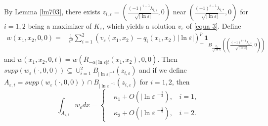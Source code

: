 \documentclass[12pt,reqno]{amsart}
\numberwithin{equation}{section}
\theoremstyle{definition}
\theoremstyle{remark}
\begin{document}
By Lemma \ref{lm703}, there exists $ z_{i,\varepsilon}=\left( \frac{(-1)^{i-1}\lambda_{i,\varepsilon}}{\sqrt{|\ln\varepsilon|}},0\right)  $ near $ \left( \frac{(-1)^{i-1}\lambda_{i,*}}{\sqrt{|\ln\varepsilon|}},0\right) $  for $ i=1,2 $ being a maximizer of $ K_\varepsilon  $, which yields a solution $ v_\varepsilon $ of \eqref{equa 3}.  Define 
\begin{equation*} 
\begin{split}
w(x_1,x_2,0,0)=&\frac{1}{\varepsilon^2}\sum_{i=1}^2\left (v_\varepsilon\left(x_1,x_2 \right) -q_i(x_1,x_2)|\ln\varepsilon| \right )^{p}_+\textbf{1}_{B_{\frac{\rho_0}{\sqrt{|\ln\varepsilon|}}}\left (\left( \frac{(-1)^{i-1}\lambda_{i,*}}{\sqrt{|\ln\varepsilon|}},0\right)\right )} 
\end{split}
\end{equation*}
and $ w(x_1,x_2,0,t)=w(\bar{R}_{-\alpha|\ln\varepsilon| t}(x_1,x_2),0,0)  $.
Then $ supp(w_\varepsilon(\cdot,0,0))\subseteq \cup_{i=1}^2 B_{|\ln\varepsilon|^{-1}}\left (z_{i,\varepsilon}\right ) $
and if we define $ A_{\varepsilon,i}=supp(w_\varepsilon(\cdot,0,0))\cap B_{|\ln\varepsilon|^{-1}}\left (z_{i,\varepsilon}\right )  $ for $ i=1,2 $, then %
\begin{equation*}
\int_{A_{\varepsilon,i}}w_\varepsilon dx=\begin{cases}
&\kappa_1+O\left(|\ln\varepsilon|^{-\frac{1}{2}} \right),\ \ \ \ i=1,\\
&\kappa_2+O\left(|\ln\varepsilon|^{-\frac{1}{2}} \right),\ \ \ \ i=2.
\end{cases}
\end{equation*}
\end{document}
